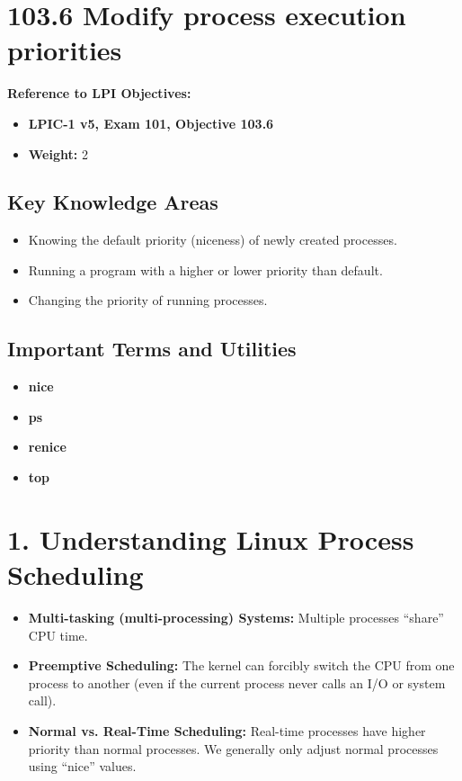 \documentclass[a4paper]{report}
\begin{document}
\newpage
\section*{103.6 Modify process execution priorities}


\textbf{Reference to LPI Objectives:}
\begin{itemize}
    \item \textbf{LPIC-1 v5, Exam 101, Objective 103.6}
    \item \textbf{Weight:} 2
\end{itemize}

\subsection*{Key Knowledge Areas}
\begin{itemize}
    \item Knowing the default priority (niceness) of newly created processes.
    \item Running a program with a higher or lower priority than default.
    \item Changing the priority of running processes.
\end{itemize}

\subsection*{Important Terms and Utilities}
\begin{itemize}
    \item \textbf{nice}
    \item \textbf{ps}
    \item \textbf{renice}
    \item \textbf{top}
\end{itemize}

\section*{1. Understanding Linux Process Scheduling}

\begin{itemize}
    \item \textbf{Multi-tasking (multi-processing) Systems:} Multiple processes “share” CPU time.
    \item \textbf{Preemptive Scheduling:} The kernel can forcibly switch the CPU from one process to another (even if the current process never calls an I/O or system call).
    \item \textbf{Normal vs. Real-Time Scheduling:} Real-time processes have higher priority than normal processes. We generally only adjust normal processes using “nice” values.
\end{itemize}
\end{document}
